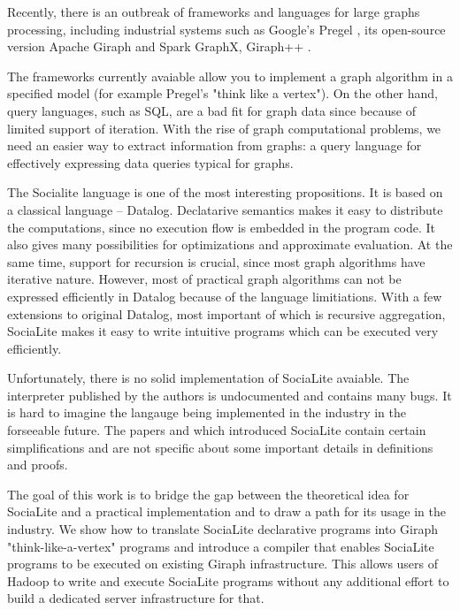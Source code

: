 \documentclass{pracamgr}
\theoremstyle{plain}
\theoremstyle{definition}
\theoremstyle{remark}
\begin{document}
Recently, there is an outbreak of frameworks and languages for large graphs processing, including industrial systems such as Google's Pregel \cite{pregel}, its open-source version Apache Giraph and Spark GraphX, Giraph++ \cite{giraphpp}.

The frameworks currently avaiable allow you to implement a graph algorithm in a specified model (for example Pregel's "think like a vertex"). On the other hand, query languages, such as SQL, are a bad fit for graph data since because of limited support of iteration. With the rise of graph computational problems, we need an easier way to extract information from graphs: a query language for effectively expressing data queries typical for graphs.

The Socialite \cite{socialite} \cite{distsoc} language is one of the most interesting propositions. It is based on a classical language -- Datalog. Declatarive semantics makes it easy to distribute the computations, since no execution flow is embedded in the program code. It also gives many possibilities for optimizations and approximate evaluation. At the same time, support for recursion is crucial, since most graph algorithms have iterative nature. However, most of practical graph algorithms can not be expressed efficiently in Datalog because of the language limitiations. With a few extensions to original Datalog, most important of which is recursive aggregation, SociaLite makes it easy to write intuitive programs which can be executed very efficiently.

Unfortunately, there is no solid implementation of SociaLite avaiable. The interpreter published by the authors is undocumented and contains many bugs. It is hard to imagine the langauge being implemented in the industry in the forseeable future. The papers \cite{socialite} and \cite{distsoc} which introduced SociaLite contain certain simplifications and are not specific about some important details in definitions and proofs.

The goal of this work is to bridge the gap between the theoretical idea for SociaLite and a practical implementation and to draw a path for its usage in the industry. We show how to translate SociaLite declarative programs into Giraph "think-like-a-vertex" programs and introduce a compiler that enables SociaLite programs to be executed on existing Giraph infrastructure. This allows users of Hadoop to write and execute SociaLite programs without any additional effort to build a dedicated server infrastructure for that.
\end{document}
